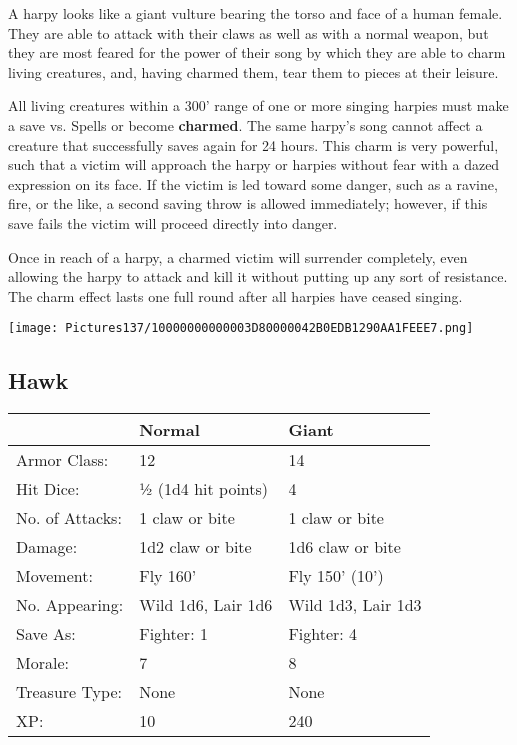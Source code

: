 \documentclass[a4paper,twoside,openany,10pt]{book}
\begin{document}
\begin{multicols}{2}
A harpy looks like a giant vulture bearing the torso and face of a human female. They are able to attack with their claws as well as with a normal weapon, but they are most feared for the power of their song by which they are able to charm living creatures, and, having charmed them, tear them to pieces at their leisure.

All living creatures within a 300' range of one or more singing harpies must make a save vs. Spells or become \textbf{charmed}. The same harpy's song cannot affect a creature that successfully saves again for 24 hours. This charm is very powerful, such that a victim will approach the harpy or harpies without fear with a dazed expression on its face. If the victim is led toward some danger, such as a ravine, fire, or the like, a second saving throw is allowed immediately; however, if this save fails the victim will proceed directly into danger.

Once in reach of a harpy, a charmed victim will surrender completely, even allowing the harpy to attack and kill it without putting up any sort of resistance. The charm effect lasts one full round after all harpies have ceased singing.

\begin{center}
	\texttt{[image: Pictures137/10000000000003D80000042B0EDB1290AA1FEEE7.png]}
\end{center}

\subsection*{Hawk}\label{hawk}

\begin{tabularx}{0.48\textwidth}{@{}llX@{}}
& Normal & Giant \\\hline
Armor Class: & 12 & 14 \\\hline
Hit Dice: & ½ (1d4 hit points) & 4 \\\hline
No. of Attacks: & 1 claw or bite & 1 claw or bite \\\hline
Damage: & 1d2 claw or bite & 1d6 claw or bite \\\hline
Movement: & Fly 160' & Fly 150'
(10') \\\hline
No. Appearing: & Wild 1d6, Lair 1d6 & Wild 1d3, Lair 1d3 \\\hline
Save As: & Fighter: 1 & Fighter: 4 \\\hline
Morale: & 7 & 8 \\\hline
Treasure Type: & None & None \\\hline
XP: & 10 & 240 \\\hline
\end{tabularx}\medskip


\end{multicols}
\end{document}
